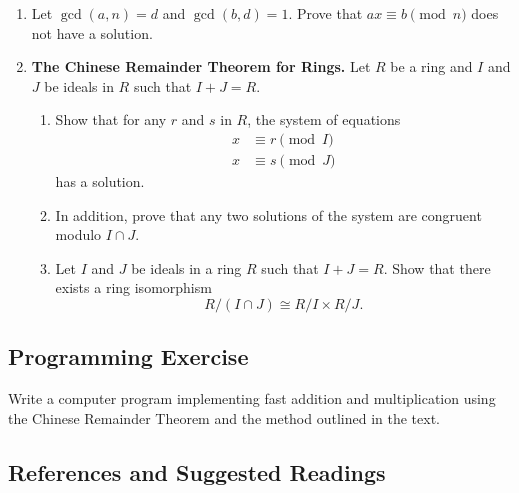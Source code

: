 {\begin{enumerate}
\item
Let $\gcd(a, n) = d$ and $\gcd(b, d) = 1$.  Prove that $ax \equiv b
\pmod{n}$ does not have a solution.
 
\item
{\bf The Chinese Remainder Theorem for Rings.}
Let $R$ be a ring and $I$ and $J$ be ideals in $R$ such that $I+J =
R$. 
\begin{enumerate}
 
  \item
Show that for any $r$ and $s$ in $R$, the system of equations
\begin{align*}
x & \equiv  r \pmod{I} \\
x & \equiv  s \pmod{J}
\end{align*}
has a solution.  
 
  \item
In addition, prove that any two solutions of the system are congruent
modulo $I \cap J$. 
 
  \item
Let $I$ and $J$ be ideals in a ring $R$ such that $I + J = R$. Show
that there exists a ring isomorphism
\[
R/(I \cap J) \cong R/I \times R/J.
\]
\end{enumerate}
 
 
 
\end{enumerate}
}
 
 
 
\subsection*{Programming Exercise}
 
 
Write a computer program implementing fast addition and multiplication
using the Chinese Remainder Theorem and the method outlined in the
text. 
 
 
 
\subsection*{References and Suggested Readings}
 
